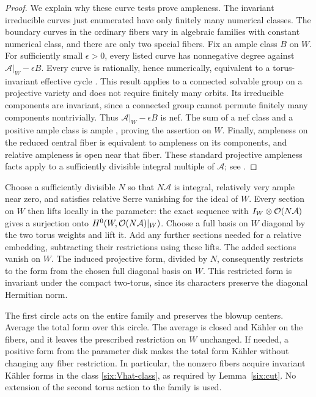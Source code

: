 \begin{proof}
We explain why these curve tests prove ampleness.  The invariant
irreducible curves just enumerated have only finitely many
numerical classes.  The boundary curves in the ordinary fibers
vary in algebraic families with constant numerical class, and
there are only two special fibers.  Fix an ample class \(B\)
on \(W\).  For sufficiently small \(\epsilon>0\), every listed
curve has nonnegative degree against
\(\mathcal A|_W-\epsilon B\).
Every curve is rationally, hence numerically, equivalent to a
torus-invariant effective cycle
\cite[Section~2]{FultonMacPhersonSottileSturmfels1995}.
This result applies to a connected solvable group on a projective
variety and does not require finitely many orbits. Its irreducible
components are invariant, since a connected group cannot permute
finitely many components nontrivially. Thus
\(\mathcal A|_W-\epsilon B\) is nef.
The sum of a nef class and a positive ample class is ample
\cite[Corollary~1.4.10]{Lazarsfeld2004},
proving the assertion on \(W\).
Finally, ampleness on the reduced central fiber is equivalent
to ampleness on its components, and relative ampleness is open
near that fiber.  These standard projective ampleness facts
apply to a sufficiently divisible integral multiple of
\(\mathcal A\); see \cite{Hartshorne1977,Lazarsfeld2004,Stacks}.
\end{proof}

Choose a sufficiently divisible \(N\) so that \(N\mathcal A\)
is integral, relatively very ample near zero, and satisfies
relative Serre vanishing for the ideal of \(W\).
Every section on \(W\) then lifts locally in the parameter:
the exact sequence with \(I_W\otimes\mathcal O(N\mathcal A)\) gives
a surjection onto \(H^0(W,\mathcal O(N\mathcal A)|_W)\).
Choose a full basis on \(W\) diagonal by the two torus weights
and lift it.  Add any further sections needed for a relative
embedding, subtracting their restrictions using these lifts.
The added sections vanish on \(W\).  The induced projective
form, divided by \(N\), consequently restricts to the form from
the chosen full diagonal basis on \(W\).
This restricted form is invariant under the compact two-torus,
since its characters preserve the diagonal Hermitian norm.

The first circle acts on the entire family and preserves the
blowup centers.  Average the total form over this circle.
The average is closed and Kähler on the fibers, and it leaves
the prescribed restriction on \(W\) unchanged.  If needed, a
positive form from the parameter disk makes the total form
Kähler without changing any fiber restriction.  In particular,
the nonzero fibers acquire invariant Kähler forms in the class
\eqref{six:Vhat-class}, as required by Lemma~\ref{six:cut}.
No extension of the second torus action to the family is used.

